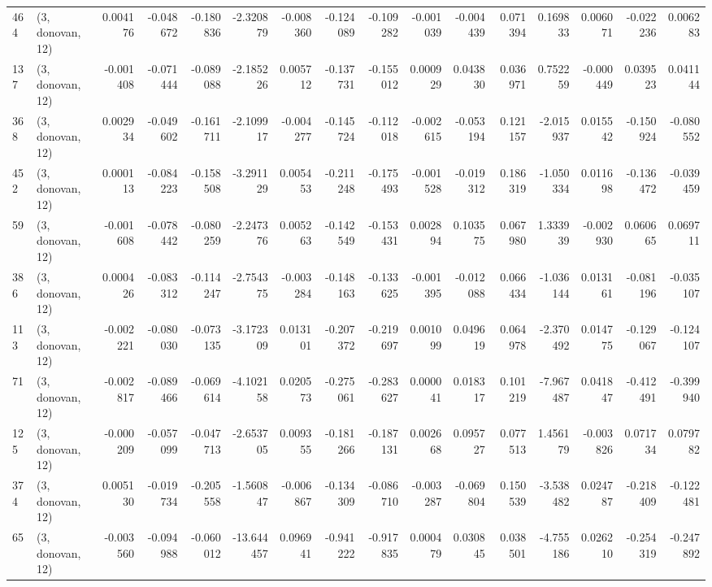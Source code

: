 \begin{tabular}{llrrrrrrrrrrrrrr}
464 &  (3, donovan, 12) &   0.004176 & -0.048672 & -0.180836 &    -2.320879 &  -0.008360 &  -0.124089 &  -0.109282 & -0.001039 & -0.004439 &  0.071394 &    0.169833 &  0.006071 & -0.022236 &  0.006283 \\
137 &  (3, donovan, 12) &  -0.001408 & -0.071444 & -0.089088 &    -2.185226 &   0.005712 &  -0.137731 &  -0.155012 &  0.000929 &  0.043830 &  0.036971 &    0.752259 & -0.000449 &  0.039523 &  0.041144 \\
368 &  (3, donovan, 12) &   0.002934 & -0.049602 & -0.161711 &    -2.109917 &  -0.004277 &  -0.145724 &  -0.112018 & -0.002615 & -0.053194 &  0.121157 &   -2.015937 &  0.015542 & -0.150924 & -0.080552 \\
452 &  (3, donovan, 12) &   0.000113 & -0.084223 & -0.158508 &    -3.291129 &   0.005453 &  -0.211248 &  -0.175493 & -0.001528 & -0.019312 &  0.186319 &   -1.050334 &  0.011698 & -0.136472 & -0.039459 \\
59  &  (3, donovan, 12) &  -0.001608 & -0.078442 & -0.080259 &    -2.247376 &   0.005263 &  -0.142549 &  -0.153431 &  0.002894 &  0.103575 &  0.067980 &    1.333939 & -0.002930 &  0.060665 &  0.069711 \\
386 &  (3, donovan, 12) &   0.000426 & -0.083312 & -0.114247 &    -2.754375 &  -0.003284 &  -0.148163 &  -0.133625 & -0.001395 & -0.012088 &  0.066434 &   -1.036144 &  0.013161 & -0.081196 & -0.035107 \\
113 &  (3, donovan, 12) &  -0.002221 & -0.080030 & -0.073135 &    -3.172309 &   0.013101 &  -0.207372 &  -0.219697 &  0.001099 &  0.049619 &  0.064978 &   -2.370492 &  0.014775 & -0.129067 & -0.124107 \\
71  &  (3, donovan, 12) &  -0.002817 & -0.089466 & -0.069614 &    -4.102158 &   0.020573 &  -0.275061 &  -0.283627 &  0.000041 &  0.018317 &  0.101219 &   -7.967487 &  0.041847 & -0.412491 & -0.399940 \\
125 &  (3, donovan, 12) &  -0.000209 & -0.057099 & -0.047713 &    -2.653705 &   0.009355 &  -0.181266 &  -0.187131 &  0.002668 &  0.095727 &  0.077513 &    1.456179 & -0.003826 &  0.071734 &  0.079782 \\
374 &  (3, donovan, 12) &   0.005130 & -0.019734 & -0.205558 &    -1.560847 &  -0.006867 &  -0.134309 &  -0.086710 & -0.003287 & -0.069804 &  0.150539 &   -3.538482 &  0.024787 & -0.218409 & -0.122481 \\
65  &  (3, donovan, 12) &  -0.003560 & -0.094988 & -0.060012 &   -13.644457 &   0.096941 &  -0.941222 &  -0.917835 &  0.000479 &  0.030845 &  0.038501 &   -4.755186 &  0.026210 & -0.254319 & -0.247892 \\

\end{tabular}
